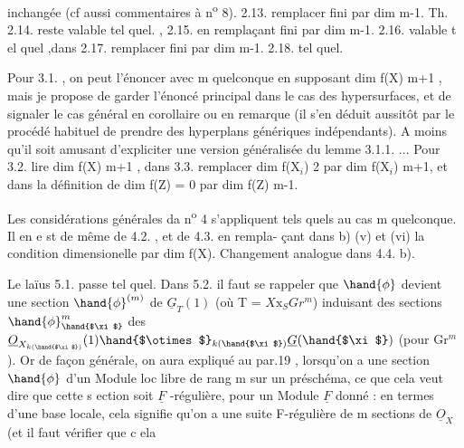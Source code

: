
inchangée (cf aussi  commentaires à n\textsuperscript{o} 8). 2.13. remplacer fini
par dim \hand{$\leqslant$} m-1. Th. 2.14. reste valable tel quel. , 2.15. en
remplaçant fini par dim \hand{$\leqslant$} m-1. 2.16. valable t el quel ,dans
 2.17. remplacer fini par dim \hand{$\leqslant$} m-1. 2.18. tel quel.

Pour 3.1. , on peut l'énoncer avec m quelconque en supposant
dim f(X) \hand{$\geqslant$} m+1 , mais je propose de garder l'énoncé principal dans
le cas des hypersurfaces, et de signaler le cas général en corollaire
ou en remarque (il s'en déduit aussitôt par le procédé habituel de
prendre des hyperplans génériques indépendants). A moins qu'il soit
amusant d'expliciter une version généralisée du lemme 3.1.1. ...
Pour 3.2. lire dim f(X)\hand{$\geqslant$} m+1 , dans 3.3. remplacer dim f(X$_i$) \hand{$\geqslant$} 2
par dim f(X$_i$)\hand{$\geqslant$} m+1, et dans la définition de  dim f(Z) = 0
par dim f(Z) \hand{$\leqslant$} m-1.

Les considérations générales da n\textsuperscript{o} 4 s'appliquent tels quels
au cas m quelconque. Il en e st de même de 4.2. , et de 4.3. en rempla-%
çant dans b) (v) et (vi) la condition dimensionelle par
dim f(X). Changement analogue dans 4.4. b).

Le laïus 5.1. passe tel quel. Dans 5.2. il faut se rappeler
que $\hand{\phi}$ devient une section $\hand{\phi}^{(m)}$ de $\underline{G}_T(1)$ (où T 
 = $X\mathrm{x}_S Gr^m$)  induisant des sections
$\hand{\phi}^m_{\hand{$\xi$}}$ des   $\underline{O}_{X_{k(\hand{$\xi$})}}(1)\hand{$\otimes$}_{k(\hand{$\xi$})}\underline{G}(\hand{$\xi$})$ (pour \hand{$\xi \in$} Gr$^m$). Or
de façon générale, on aura expliqué au par.19 , lorsqu'on a une
\margin{$\|$} section $\hand{\phi}$ d'un Module loc libre de rang m sur un préschéma, ce que
ce\deleted{\ }la veut dire que cette s ection soit $\underline{F}$ -régulière, pour un Module
$\underline{F}$ donné : en termes d'une base locale, cela signifie qu'on a une
suite F-régulière de m sections de $\underline{O}_X$ (et il faut vérifier que c ela

